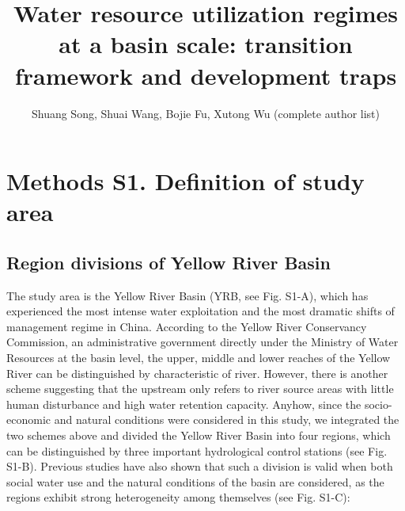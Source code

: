 \documentclass[9pt,twoside,lineno]{pnas-new}
\title{Water resource utilization regimes at a basin scale: transition framework and development traps}
\author{Shuang Song, Shuai Wang, Bojie Fu, Xutong Wu (complete author list)}
\begin{document}

\maketitle




\section*{Methods S1. Definition of study area}

\subsection*{Region divisions of Yellow River Basin}

The study area is the Yellow River Basin (YRB, see Fig. S1-A), which has experienced the most intense water exploitation and the most dramatic shifts of management regime in China. According to the Yellow River Conservancy Commission, an administrative government directly under the Ministry of Water Resources at the basin level, the upper, middle and lower reaches of the Yellow River can be distinguished by characteristic of river. However, there is another scheme suggesting that the upstream only refers to river source areas with little human disturbance and high water retention capacity. Anyhow, since the socio-economic and natural conditions were considered in this study, we integrated the two schemes above and divided the Yellow River Basin into four regions, which can be distinguished by three important hydrological control stations (see Fig. S1-B). Previous studies have also shown that such a division is valid when both social water use and the natural conditions of the basin are considered, as the regions exhibit strong heterogeneity among themselves (see Fig. S1-C):
\end{document}

